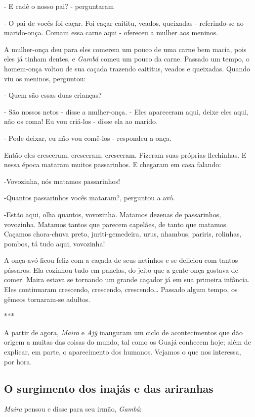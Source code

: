 - E cadê o nosso pai? - perguntaram

- O pai de vocês foi caçar. Foi caçar caititu, veados, queixadas -
referindo-se ao marido-onça. Comam essa carne aqui - ofereceu a mulher
aos meninos.

A mulher-onça deu para eles comerem um pouco de uma carne bem macia,
pois eles já tinham dentes, e \emph{Gambá} comeu um pouco da carne.
Passado um tempo, o homem-onça voltou de sua caçada trazendo caititus,
veados e queixadas. Quando viu os meninos, perguntou:

- Quem são essas duas crianças?

- São nossos netos - disse a mulher-onça\emph{.} - Eles apareceram aqui,
deixe eles aqui, não os coma! Eu vou criá-los - disse ela ao
marido\emph{.}

- Pode deixar, eu não vou comê-los - respondeu a onça.

Então eles cresceram, cresceram, cresceram. Fizeram suas próprias
flechinhas. E nessa época mataram muitos passarinhos. E chegaram em casa
falando:

-Vovozinha, nós matamos passarinhos!

-Quantos passarinhos vocês mataram?, perguntou a avó.

-Estão aqui, olha quantos, vovozinha. Matamos dezenas de passarinhos,
vovozinha. Matamos tantos que parecem capelães, de tanto que matamos.
Caçamos chora-chuva preto, juriti-gemedeira, urus, nhambus, pariris,
rolinhas, pombos, tá tudo aqui, vovozinha!

A onça-avó ficou feliz com a caçada de seus netinhos e se deliciou com
tantos pássaros. Ela cozinhou tudo em panelas, do jeito que a gente-onça
gostava de comer. Maira estava se tornando um grande caçador já em sua
primeira infância. Eles continuaram crescendo, crescendo, crescendo\ldots{}
Passado algum tempo, os gêmeos tornaram-se adultos.

***

A partir de agora, \emph{Maira} e \emph{Ajỹ} inauguram um ciclo de
acontecimentos que dão origem a muitas das coisas do mundo, tal como os
Guajá conhecem hoje; além de explicar, em parte, o aparecimento dos
humanos. Vejamos o que nos interessa, por hora.

\subsection{O surgimento dos inajás e das ariranhas}

\emph{Maira} pensou e disse para seu irmão, \emph{Gambá}:

